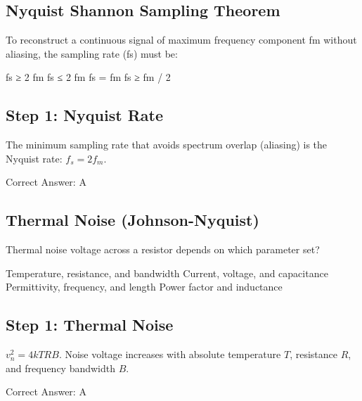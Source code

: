 \clearpage

\subsection{Nyquist Shannon Sampling Theorem}

To reconstruct a continuous signal of maximum frequency component fm without aliasing, the sampling rate (fs) must be:

\begin{choices}
    \correctchoice fs ≥ 2 fm
    \choice fs ≤ 2 fm
    \choice fs = fm
    \choice fs ≥ fm / 2
\end{choices}

\begin{solution}

\subsection*{Step 1: Nyquist Rate}
The minimum sampling rate that avoids spectrum overlap (aliasing) is the Nyquist rate: $f_s = 2 f_m$.

Correct Answer: A
\end{solution}

\clearpage

\subsection{Thermal Noise (Johnson-Nyquist)}

Thermal noise voltage across a resistor depends on which parameter set?

\begin{choices}
    \correctchoice Temperature, resistance, and bandwidth
    \choice Current, voltage, and capacitance
    \choice Permittivity, frequency, and length
    \choice Power factor and inductance
\end{choices}

\begin{solution}

\subsection*{Step 1: Thermal Noise}
$v_n^2 = 4 k T R B$. Noise voltage increases with absolute temperature $T$, resistance $R$, and frequency bandwidth $B$.

Correct Answer: A
\end{solution}

\clearpage

